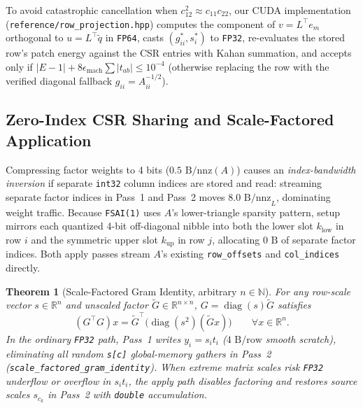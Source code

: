 \documentclass[10pt]{article}
\newtheorem{theorem}{Theorem}
\begin{document}
To avoid catastrophic cancellation when $c_{12}^2 \approx c_{11}c_{22}$, our CUDA implementation (\texttt{reference/row\_projection.hpp}) computes the component of $v = L^\top e_m$ orthogonal to $u = L^\top \tilde{q}$ in \texttt{FP64}, casts $(g_{ii}^*, s_i^*)$ to \texttt{FP32}, re-evaluates the stored row's patch energy against the CSR entries with Kahan summation, and accepts only if $|E - 1| + 8 \epsilon_{\mathrm{mach}} \sum |t_{ab}| \le 10^{-4}$ (otherwise replacing the row with the verified diagonal fallback $g_{ii} = A_{ii}^{-1/2}$).

\subsection{Zero-Index CSR Sharing and Scale-Factored Application}
Compressing factor weights to 4 bits ($0.5\text{ B/nnz}(A)$) causes an \emph{index-bandwidth inversion} if separate \texttt{int32} column indices are stored and read: streaming separate factor indices in Pass~1 and Pass~2 moves $8.0\text{ B/nnz}_L$, dominating weight traffic. Because \texttt{FSAI(1)} uses $A$'s lower-triangle sparsity pattern, setup mirrors each quantized 4-bit off-diagonal nibble into both the lower slot $k_{\mathrm{low}}$ in row $i$ and the symmetric upper slot $k_{\mathrm{up}}$ in row $j$, allocating $0\text{ B}$ of separate factor indices. Both apply passes stream $A$'s existing \texttt{row\_offsets} and \texttt{col\_indices} directly.

\begin{theorem}[Scale-Factored Gram Identity, arbitrary $n \in \mathbb{N}$]
For any row-scale vector $s \in \mathbb{R}^n$ and unscaled factor $\tilde{G} \in \mathbb{R}^{n \times n}$, $G = \operatorname{diag}(s)\tilde{G}$ satisfies
\[
  (G^\top G) x = \tilde{G}^\top \bigl(\operatorname{diag}(s^2)(\tilde{G} x)\bigr) \qquad \forall x \in \mathbb{R}^n.
\]
In the ordinary \texttt{FP32} path, Pass~1 writes $y_i = s_i t_i$ ($4\text{ B/row}$ smooth scratch), eliminating all random \texttt{s[c]} global-memory gathers in Pass~2 (\texttt{scale\_factored\_gram\_identity}). When extreme matrix scales risk \texttt{FP32} underflow or overflow in $s_i t_i$, the apply path disables factoring and restores source scales $s_{c_k}$ in Pass~2 with \texttt{double} accumulation.
\end{theorem}
\end{document}
